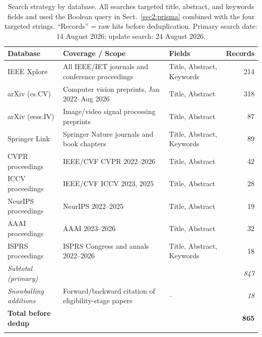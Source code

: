 \begin{table}[h]
\caption{Search strategy by database. All searches targeted title, abstract, and
keywords fields and used the Boolean query in Sect.~\ref{sec2:prisma} combined
with the four targeted strings. ``Records'' = raw hits before deduplication.
Primary search date: 14 August 2026; update search: 24 August 2026.}\label{tab:search_strategy}
\small\setlength\tabcolsep{4pt}
\begin{tabular*}{\textwidth}{@{\extracolsep\fill}p{3.0cm}p{5.2cm}p{2.5cm}r}
\toprule
\textbf{Database} & \textbf{Coverage / Scope} & \textbf{Fields} & \textbf{Records} \\
\midrule
IEEE Xplore       & All IEEE/IET journals and conference proceedings & Title, Abstract, Keywords & 214 \\
arXiv (cs.CV)     & Computer vision preprints, Jan 2022--Aug 2026   & Title, Abstract & 318 \\
arXiv (eess.IV)   & Image/video signal processing preprints         & Title, Abstract & 87  \\
Springer Link     & Springer Nature journals and book chapters      & Title, Abstract, Keywords & 89  \\
CVPR proceedings  & IEEE/CVF CVPR 2022--2026                       & Title, Abstract & 42  \\
ICCV proceedings  & IEEE/CVF ICCV 2023, 2025                        & Title, Abstract & 28  \\
NeurIPS proceedings & NeurIPS 2022--2025                            & Title, Abstract & 19  \\
AAAI proceedings  & AAAI 2023--2026                                 & Title, Abstract & 32  \\
ISPRS proceedings & ISPRS Congress and annals 2022--2026           & Title, Abstract, Keywords & 18  \\
\midrule
\textit{Subtotal (primary)} & & & \textit{847} \\
\textit{Snowballing additions} & Forward/backward citation of eligibility-stage papers & -- & \textit{18} \\
\textbf{Total before dedup} & & & \textbf{865} \\
\botrule
\end{tabular*}
\end{table}

